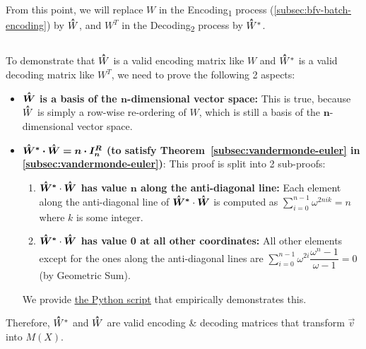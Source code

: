 $ $

$ $

From this point, we will replace $W$ in the \textsf{Encoding\textsubscript{1}} process (\autoref{subsec:bfv-batch-encoding}) by $\hathat{W}$, and $W^T$ in the \textsf{Decoding\textsubscript{2}} process by $\hathat{W}^*$. 

$ $

To demonstrate that $\hathat{W}$ is a valid encoding matrix like $W$ and $\hathat{W}^*$ is a valid decoding matrix like $W^T$, we need to prove the following 2 aspects:
\begin{itemize}[leftmargin=3\parindent]

\item \textbf{${\hathat{\bm W}}$ is a basis of the $\bm{n}$-dimensional vector space:} This is true, because $\hathat{W}$ is simply a row-wise re-ordering of $W$, which is still a basis of the $\bm{n}$-dimensional vector space.

\item \textbf{$\hathat{\bm W}^{\bm{*}} \bm{\cdot} \hathat{\bm{W}} \bm{ = n \cdot I_n^R}$ (to satisfy Theorem~\ref*{subsec:vandermonde-euler} in \autoref{subsec:vandermonde-euler})}: This proof is split into 2 sub-proofs: 
\begin{enumerate}[leftmargin=2\parindent]
\item \textbf{${\hathat{\bm W}^{\bm *} \cdot \hathat{\bm W}}$ has value $\bm{n}$ along the anti-diagonal line:} Each element along the anti-diagonal line of $\hathat{\bm W}^{\bm *} \cdot \hathat{\bm W}$ is computed as $\sum\limits_{i=0}^{n-1} \omega^{2nik} = n$ where $k$ is some integer.
\item \textbf{${\hathat{\bm W}^{\bm *} \cdot \hathat{\bm W}}$ has value 0 at all other coordinates:} All other elements except for the ones along the anti-diagonal lines are $\sum\limits_{i=0}^{n-1}\omega^{2i} \dfrac{\omega^n - 1}{\omega - 1} = 0$ (by Geometric Sum). 
\end{enumerate}

We provide \href{https://github.com/gogo9th/fhe-textbook/blob/main/soruce%20code/bfv_j_matrix_inverse_proof.py}{\underline{the Python script}} that empirically demonstrates this. 

\end{itemize}




Therefore, $\hathat{W}^*$ and $\hathat{W}$ are valid encoding \& decoding matrices that transform $\vec{v}$ into $M(X)$. 

$ $

